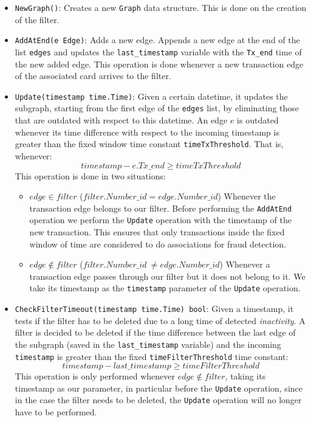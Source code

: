 \begin{itemize}
    \item \texttt{NewGraph()}: Creates a new \texttt{Graph} data structure. This is done on the creation of the filter.
    
    \item \texttt{AddAtEnd(e Edge)}: Adds a new edge. Appends a new edge at the end of the list \texttt{edges} and updates the \texttt{last\_timestamp} variable with the \texttt{Tx\_end} time of the new added edge. This operation is done whenever a new transaction edge of the associated card arrives to the filter.
    
    \item \texttt{Update(timestamp time.Time)}: Given a certain datetime, it updates the subgraph, starting from the first edge of the \texttt{edges} list, by eliminating those that are outdated with respect to this datetime. An edge $e$ is outdated  whenever its time difference with respect to the incoming timestamp is greater than the fixed window time constant \texttt{timeTxThreshold}. That is, whenever: $$timestamp - e.Tx\_end \geq timeTxThreshold$$
    This operation is done in two situations:
    \begin{itemize}
        \item $edge \in filter$ ($filter.Number\_id = edge.Number\_id$) Whenever the transaction edge belongs to our filter. Before performing the \texttt{AddAtEnd} operation we perform the \texttt{Update} operation with the timestamp of the new transaction. This ensures that only transactions inside the fixed window of time are considered to do associations for fraud detection. 
        \item $edge \notin filter$ ($filter.Number\_id\ \neq edge.Number\_id$) Whenever a transaction edge passes through our filter but it does not belong to it. We take its timestamp as the \texttt{timestamp} parameter of the \texttt{Update} operation.
    \end{itemize}
    
    \item \texttt{CheckFilterTimeout(timestamp time.Time) bool}: Given a timestamp, it tests if the filter has to be deleted due to a long time of detected \textit{inactivity}. A filter is decided to be deleted if the time difference between the last edge of the subgraph (saved in the \texttt{last\_timestamp} variable) and the incoming \texttt{timestamp} is greater than the fixed \texttt{timeFilterThreshold} time constant: $$timestamp - last\_timestamp \geq timeFilterThreshold$$
    This operation is only performed whenever $edge \notin filter$, taking its timestamp as our parameter, in particular before the \texttt{Update} operation, since in the case the filter needs to be deleted, the \texttt{Update} operation will no longer have to be performed.


\end{itemize}
